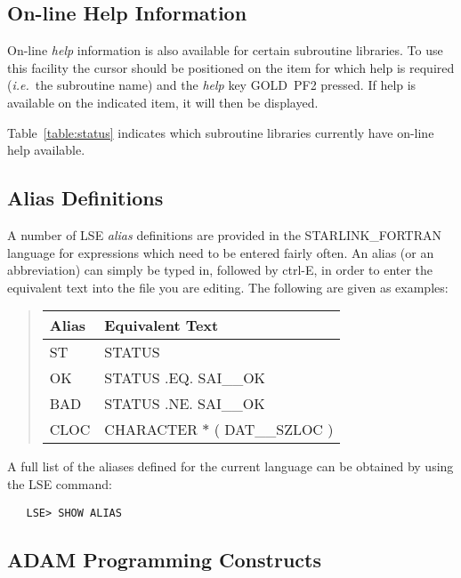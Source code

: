 \subsection{On-line Help Information}

On-line {\em help} information is also available for certain subroutine
libraries.
To use this facility the cursor should be positioned on the item for which help
is required ({\em i.e.}\ the subroutine name) and the {\em help} key
\mbox{GOLD}~\mbox{PF2} pressed.
If help is available on the indicated item, it will then be displayed.

Table~\ref{table:status} indicates which subroutine libraries currently have
on-line help available.


\subsection{Alias Definitions}

A number of \mbox{LSE} {\em alias} definitions are provided in the
\mbox{STARLINK\_FORTRAN} language for expressions which need to be entered
fairly often.
An alias (or an abbreviation) can simply be typed in, followed by
\mbox{ctrl-E}, in order to enter the equivalent text into the file you are
editing.
The following are given as examples:

\begin{quote}
\begin{center}
\begin{tabular}{l|l}
{\bf Alias} & {\bf Equivalent Text}\\
\hline
ST & STATUS\\
OK & STATUS .EQ. SAI\_\_OK\\
BAD & STATUS .NE. SAI\_\_OK\\
CLOC & CHARACTER $*$ ( DAT\_\_SZLOC )
\end{tabular}
\end{center}
\end{quote}

A full list of the aliases defined for the current language can be obtained
by using the \mbox{LSE} command:

\begin{verbatim}
   LSE> SHOW ALIAS
\end{verbatim}


\subsection{ADAM Programming Constructs}
\label{sect:adamconstructs}


